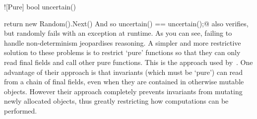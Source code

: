 \Q![Pure] bool uncertain() {return new Random().Next() %
And so \Q@assert uncertain() == uncertain();@ also verifies, but randomly fails with an exception at runtime.
As you can see, failing to handle non-determinism jeopardises reasoning.
A simpler and more restrictive solution to these problems is to restrict `pure' functions so that they can only read final fields and call other pure functions. This is the approach used by~\cite{Flanagan06hybridtypes}. One advantage of their approach is that invariants (which must be `pure') can read from a chain of final fields, even when they are contained in otherwise mutable objects. However their approach completely prevents invariants from mutating newly allocated objects, thus greatly restricting how computations can be performed.





















%
%
%
%



}
